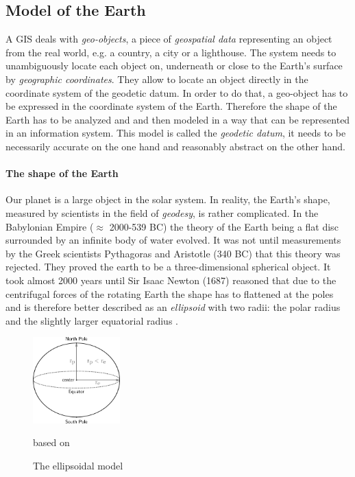 

\subsection{Model of the Earth} %
\label{sub:model_of_the_earth}

A GIS deals with \emph{geo-objects}, a piece of \emph{geospatial data} representing an object from the real world, e.g. a country, a city or a lighthouse. The system needs to unambiguously locate each object on, underneath or close to the Earth's surface by \emph{geographic coordinates}. They allow to locate an object directly in the coordinate system of the geodetic datum. In order to do that, a geo-object has to be expressed in the coordinate system of the Earth. Therefore the shape of the Earth has to be analyzed and and then modeled in a way that can be represented in an information system. This model is called the \emph{geodetic datum}, it needs to be necessarily accurate on the one hand and reasonably abstract on the other hand.


\paragraph{The shape of the Earth} %
\label{par:the_shape_of_the_earth}

Our planet is a large object in the solar system. In reality, the Earth's shape, measured by scientists in the field of \emph{geodesy}, is rather complicated. In the Babylonian Empire ($\approx$ 2000-539 BC) the theory of the Earth being a flat disc surrounded by an infinite body of water
evolved. It was not until measurements by the Greek scientists Pythagoras and Aristotle (340 BC) that this theory was rejected. They proved the earth to be a three-dimensional spherical object. It took almost 2000 years until Sir Isaac Newton (1687) reasoned that due to the centrifugal forces of the rotating Earth the shape has to flattened at the poles and is therefore better described as an \emph{ellipsoid} with two radii: the polar radius and the slightly larger equatorial radius
\cite[pp. 69-77]{bolstad2008gis}.

\begin{figure}[ht]
  \centering
  \includegraphics[width = 0.3\textwidth]{graphics/basics/ellipsoid}
  \caption{The ellipsoidal model}
  \small{based on \cite[Fig. 3-3, p. 72]{bolstad2008gis}}
  \label{fig:ellipsoid}
\end{figure}

